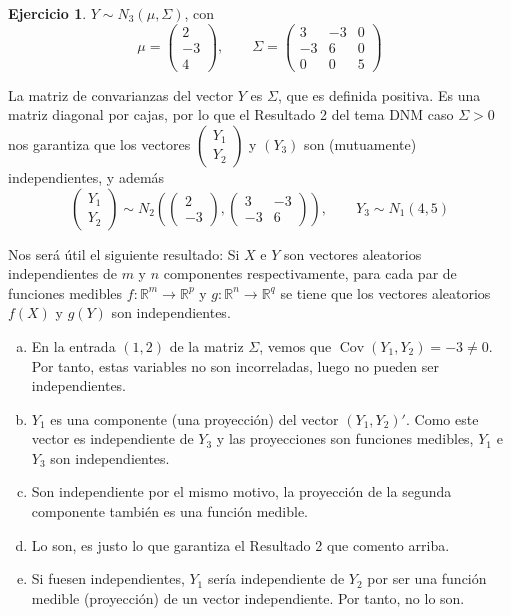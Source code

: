 \documentclass[12pt,spanish]{article}
\theoremstyle{definition}
\newtheorem{exercise}{Ejercicio}
\begin{document}
\newpage

\begin{exercise}
  $Y\sim N_3(\mu,\Sigma)$, con
  \[\mu=
    \begin{pmatrix}
      2 \\
      -3 \\
      4
    \end{pmatrix},\qquad \Sigma=
    \begin{pmatrix}
      3 & -3 & 0 \\
      -3 & 6 & 0 \\
      0 & 0 & 5
    \end{pmatrix}
  \]

  La matriz de convarianzas del vector $Y$ es $\Sigma$, que es
  definida positiva. Es una matriz diagonal por cajas, por lo que el
  Resultado 2 del tema DNM caso $\Sigma>0$ nos garantiza que los
  vectores $
  \begin{pmatrix}
    Y_1 \\
    Y_2
  \end{pmatrix}$ y $(Y_3)$ son (mutuamente) independientes, y además
  \[\begin{pmatrix}
    Y_1 \\
    Y_2
  \end{pmatrix}\sim N_2\left(\begin{pmatrix}
      2 \\
      -3
    \end{pmatrix},\begin{pmatrix}
      3 & -3 \\
      -3 & 6
    \end{pmatrix}\right),\qquad Y_3\sim N_1(4,5)\]

Nos será útil el siguiente resultado: Si $X$ e $Y$ son vectores
aleatorios independientes de $m$ y $n$ componentes respectivamente,
para cada par de funciones medibles
$f:\mathbb{R }^m\rightarrow\mathbb{R}^p$ y
$g:\mathbb{R }^n\rightarrow\mathbb{R}^q$ se tiene que los vectores
aleatorios $f(X)$ y $g(Y)$ son independientes.
  
  \begin{enumerate}[a)]
  \item En la entrada $(1,2)$ de la matriz $\Sigma$, vemos que
    $\operatorname{Cov}(Y_1,Y_2)=-3\neq 0$. Por tanto, estas variables
    no son incorreladas, luego no pueden ser independientes.
  \item $Y_1$ es una componente (una proyección) del vector
    $(Y_1,Y_2)'$. Como este vector es independiente de $Y_3$ y las
    proyecciones son funciones medibles, $Y_1$ e $Y_3$ son
    independientes.
  \item Son independiente por el mismo motivo, la proyección de la
    segunda componente también es una función medible.
  \item Lo son, es justo lo que garantiza el Resultado 2 que comento
    arriba.
  \item Si fuesen independientes, $Y_1$ sería independiente de $Y_2$
    por ser una función medible (proyección) de un vector
    independiente. Por tanto, no lo son.
  \end{enumerate}
\end{exercise}
\end{document}
